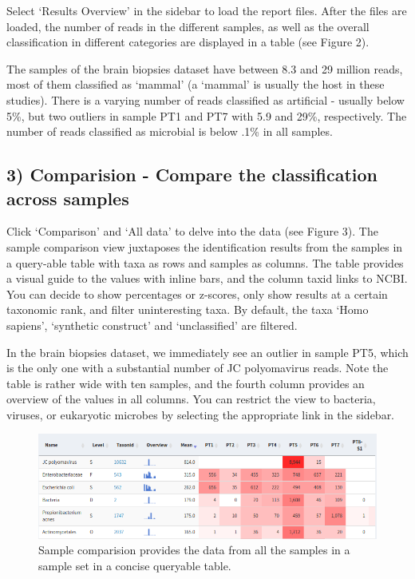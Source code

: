 \documentclass[]{article}
\begin{document}
Select `Results Overview' in the sidebar to load the report files. After
the files are loaded, the number of reads in the different samples, as
well as the overall classification in different categories are displayed
in a table (see Figure 2).

The samples of the brain biopsies dataset have between 8.3 and 29
million reads, most of them classified as `mammal' (a `mammal' is
usually the host in these studies). There is a varying number of reads
classified as artificial - usually below 5\%, but two outliers in sample
PT1 and PT7 with 5.9 and 29\%, respectively. The number of reads
classified as microbial is below .1\% in all samples.

\subsection{3) Comparision - Compare the classification across
samples}\label{comparision---compare-the-classification-across-samples}

Click `Comparison' and `All data' to delve into the data (see Figure 3).
The sample comparison view juxtaposes the identification results from
the samples in a query-able table with taxa as rows and samples as
columns. The table provides a visual guide to the values with inline
bars, and the column taxid links to NCBI. You can decide to show
percentages or z-scores, only show results at a certain taxonomic rank,
and filter uninteresting taxa. By default, the taxa `Homo sapiens',
`synthetic construct' and `unclassified' are filtered.

In the brain biopsies dataset, we immediately see an outlier in sample
PT5, which is the only one with a substantial number of JC polyomavirus
reads. Note the table is rather wide with ten samples, and the fourth
column provides an overview of the values in all columns. You can
restrict the view to bacteria, viruses, or eukaryotic microbes by
selecting the appropriate link in the sidebar.

\begin{figure}[htbp]
\centering
\includegraphics{menu-comp.png}
\caption{Sample comparision provides the data from all the samples in a
sample set in a concise queryable table.}
\end{figure}
\end{document}
